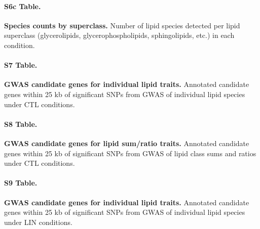 \documentclass[9pt,twocolumn,twoside]{rilabRxiv}
\begin{document}
\paragraph*{S6c Table.}
\makeatletter
\def\@currentlabelname{S6c Table} 
\makeatother
\label{S6c_Table}                                                                                  
\textbf{Species counts by superclass.} Number of lipid species detected per lipid superclass (glycerolipids, glycerophospholipids, sphingolipids, etc.) in each condition.                      
                                                                                                                                                      
                                                                                                 
\paragraph*{S7 Table.}    
\makeatletter
\def\@currentlabelname{S7 Table} 
\makeatother
\label{S7_Table}                                                                                   
\textbf{GWAS candidate genes for individual lipid traits.} Annotated candidate genes within 25 kb of significant SNPs from GWAS of individual lipid species under CTL conditions.               
                                                                                                 
\paragraph*{S8 Table.}
\makeatletter
\def\@currentlabelname{S8 Table} 
\makeatother
\label{S8_Table}                                                                                   
\textbf{GWAS candidate genes for lipid sum/ratio traits.} Annotated candidate genes within 25 kb of significant SNPs from GWAS of lipid class sums and ratios under CTL conditions.

\paragraph*{S9 Table.}    
\makeatletter
\def\@currentlabelname{S9 Table} 
\makeatother
\label{S9_Table}                                                                                   
\textbf{GWAS candidate genes for individual lipid traits.} Annotated candidate genes within 25 kb of significant SNPs from GWAS of individual lipid species under LIN conditions.               
                                                                                                 
\end{document}
